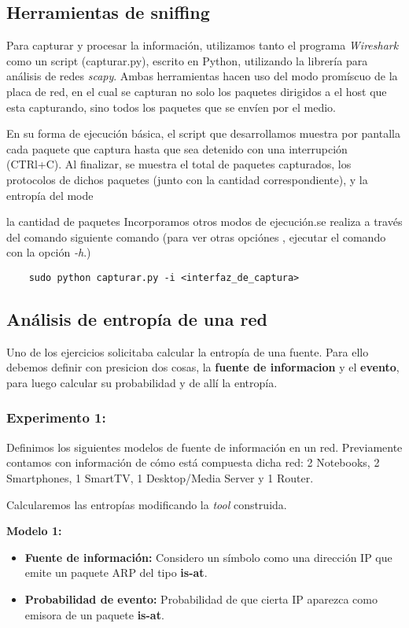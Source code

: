 \subsection{Herramientas de sniffing}

Para capturar y procesar la información, utilizamos tanto el programa \textit{Wireshark} como un script (capturar.py), escrito en Python, utilizando la librería para análisis de redes \textit{scapy}. Ambas herramientas hacen uso del modo promíscuo de la placa de red, en el cual se capturan no solo los paquetes dirigidos a el host que esta capturando, sino todos los paquetes que se envíen por el medio.

En su forma de ejecución básica, el script que desarrollamos muestra por pantalla cada paquete que captura hasta que sea detenido con una interrupción (CTRl+C). Al finalizar, se muestra el total de paquetes capturados, los protocolos de dichos paquetes (junto con la cantidad correspondiente), y la entropía del mode

 la cantidad de paquetes  Incorporamos otros modos de ejecución.se realiza a través del comando siguiente comando (para ver otras opciónes , ejecutar el comando con la opción \textit{-h}.)

\begin{verbatim}
	sudo python capturar.py -i <interfaz_de_captura>
\end{verbatim}



\subsection{Análisis de entropía de una red}
Uno de los ejercicios solicitaba calcular la entropía de una fuente.
Para ello debemos definir con presicion dos cosas, la \textbf{fuente de informacion} y el \textbf{evento}, para luego calcular su probabilidad
y de allí la entropía.

\subsubsection{Experimento 1:}

Definimos los siguientes modelos de fuente de información en un red. Previamente contamos con información de cómo está compuesta dicha red: 2 Notebooks, 2 Smartphones, 1 SmartTV, 1 Desktop/Media Server y 1 Router.

Calcularemos las entropías modificando la \textit{tool} construida. 

\textbf{Modelo 1:}
\begin{itemize}
\item \textbf{Fuente de información:} Considero un símbolo como una dirección IP que emite un paquete ARP del tipo \textbf{is-at}.
\item \textbf{Probabilidad de evento:} Probabilidad de que cierta IP aparezca como emisora de un paquete \textbf{is-at}.
\end{itemize}



